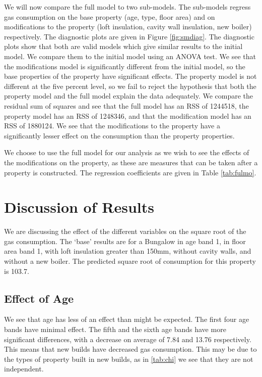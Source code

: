 \documentclass[9pt]{extarticle}
\begin{document}
We will now compare the full model to two sub-models. The sub-models regress gas consumption on the base property (age, type, floor area) and on modifications to the property (loft insulation, cavity wall insulation, new boiler) respectively. The diagnostic plots are given in Figure \ref{fig:smdiag}. The diagnostic plots show that both are valid models which give similar results to the initial model. We compare them to the initial model using an ANOVA test. We see that the modifications model is significantly different from the initial model, so the base properties of the property have significant effects. The property model is not different at the five percent level, so we fail to reject the hypothesis that both the property model and the full model explain the data adequately. We compare the residual sum of squares and see that the full model has an RSS of 1244518, the property model has an RSS of 1248346, and that the modification model has an RSS of 1880124. We see that the modifications to the property have a significantly lesser effect on the consumption than the property properties.

We choose to use the full model for our analysis as we wish to see the effects of the modifications on the property, as these are measures that can be taken after a property is constructed. The regression coefficients are given in Table \ref{tab:fulmo}.

\section{Discussion of Results}

We are discussing the effect of the different variables on the square root of the gas consumption. The `base' results are for a Bungalow in age band 1, in floor area band 1, with loft insulation greater than 150mm, without cavity walls, and without a new boiler. The predicted square root of consumption for this property is 103.7. 

\subsection{Effect of Age}
We see that age has less of an effect than might be expected. The first four age bands have minimal effect. The fifth and the sixth age bands have more significant differences, with a decrease on average of 7.84 and 13.76 respectively. This means that new builds have decreased gas consumption. This may be due to the types of property built in new builds, as in \ref{tab:chi} we see that they are not independent.
\end{document}
